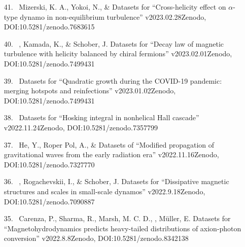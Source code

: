 \begin{itemize}
\item[{41.}~]
Mizerski, K. A., Yokoi, N., \& \Brandenburg{}
{Datasets for ``Cross-helicity effect on $\alpha$-type dynamo in non-equilibrium turbulence'' v2023.02.28}{Zenodo, DOI:10.5281/zenodo.7683615}

\item[{40.}~]
\Brandenburg, Kamada, K., \& Schober, J.
{Datasets for ``Decay law of magnetic turbulence with helicity balanced by chiral fermions'' v2023.02.01}{Zenodo, DOI:10.5281/zenodo.7499431}

\item[{39.}~]
\Brandenburg{}
{Datasets for ``Quadratic growth during the COVID-19 pandemic: merging hotspots and reinfections'' v2023.01.02}{Zenodo, DOI:10.5281/zenodo.7499431}

\item[{38.}~]
\Brandenburg{}
{Datasets for ``Hosking integral in nonhelical Hall cascade'' v2022.11.24}{Zenodo, DOI:10.5281/zenodo.7357799}

\item[{37.}~]
He, Y., Roper Pol, A., \& \Brandenburg{}
{Datasets of ``Modified propagation of gravitational waves from the early radiation era'' v2022.11.16}{Zenodo, DOI:10.5281/zenodo.7327770}

\item[{36.}~]
\Brandenburg, Rogachevskii, I., \& Schober, J.
{Datasets for ``Dissipative magnetic structures and scales in small-scale dynamos'' v2022.9.18}{Zenodo, DOI:10.5281/zenodo.7090887}

\item[{35.}~]
Carenza, P., Sharma, R., Marsh, M. C. D., \Brandenburg, M\"uller, E.
{Datasets for ``Magnetohydrodynamics predicts heavy-tailed distributions of axion-photon conversion'' v2022.8.8}{Zenodo, DOI:10.5281/zenodo.8342138}


\end{itemize}
